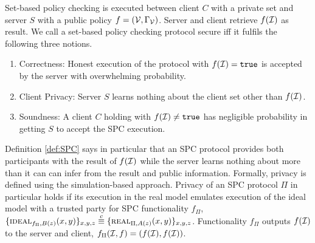 \begin{definition}\label{def:SPC}
Set-based policy checking is executed between client $C$ with a private set \ClientSet and server $S$ with a public policy $f=(\mathcal{V},\Gamma_\mathcal{V})$.
Server and client retrieve $f(\mathcal{I})$ as result. 
We call a set-based policy checking protocol secure iff it fulfils the following three notions.
\begin{enumerate}
  \item Correctness: Honest execution of the protocol with $f(\mathcal{I})=\mathtt{true}$ is accepted by the server with overwhelming probability.
  \item Client Privacy: Server $S$ learns nothing about the client set \ClientSet other than $f(\mathcal{I})$.
  \item Soundness: A client $C$ holding \ClientSet with $f(\mathcal{I})\not=\mathtt{true}$ has negligible probability in getting $S$ to accept the \ac{SPC} execution. \eod
\end{enumerate}
\end{definition}

\noindent
Definition \ref{def:SPC} says in particular that an \ac{SPC} protocol provides both participants with the result of $f(\mathcal{I})$ while the server learns nothing about \ClientSet more than it can can infer from the result and public information.
Formally, privacy is defined using the simulation-based approach.
Privacy of an \ac{SPC} protocol $\Pi$ in particular holds if its execution in the real model emulates execution of the ideal model with a trusted party for \ac{SPC} functionality $f_\Pi$, \ie
$ \{\IDEAL_{f_\Pi, B(z)}(x, y)\}_{x, y, z} \stackrel{c}{\equiv} \{\REAL_{\Pi, A(z)}(x, y)\}_{x, y, z}$.
Functionality $f_\Pi$ outputs $f(\mathcal{I})$ to the server and client, \ie $f_{\Pi}(\mathcal{I}, f)=(f(\mathcal{I}), f(\mathcal{I}))$.

